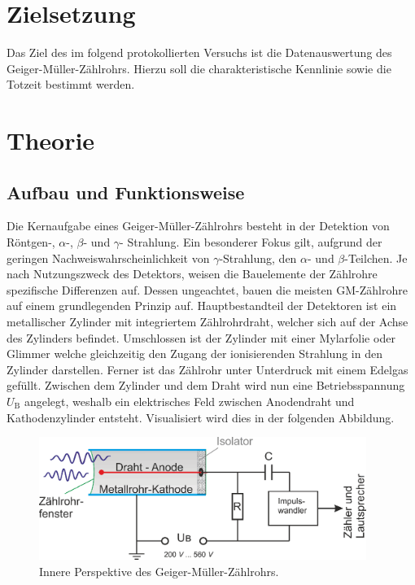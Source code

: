 %

%

\section{Zielsetzung}
\label{sec:Zielsetzung}

Das Ziel des im folgend protokollierten Versuchs ist die Datenauswertung des Geiger-Müller-Zählrohrs. Hierzu soll die 
charakteristische Kennlinie sowie die Totzeit bestimmt werden.

\section{Theorie}
\label{sec:Theorie}

\subsection{Aufbau und Funktionsweise}

\noindent Die Kernaufgabe eines Geiger-Müller-Zählrohrs besteht in der Detektion von Röntgen-, $\alpha$-, $\beta$- und $\gamma$-
Strahlung. Ein besonderer Fokus gilt, aufgrund der geringen Nachweiswahrscheinlichkeit von $\gamma$-Strahlung, den
$\alpha$- und $\beta$-Teilchen. Je nach Nutzungszweck des Detektors, weisen die Bauelemente der Zählrohre spezifische 
Differenzen auf. Dessen ungeachtet, bauen die meisten GM-Zählrohre auf einem grundlegenden Prinzip auf. Hauptbestandteil 
der Detektoren ist ein metallischer Zylinder mit integriertem Zählrohrdraht, welcher sich auf der Achse des Zylinders 
befindet. Umschlossen ist der Zylinder mit einer Mylarfolie oder Glimmer welche gleichzeitig den Zugang der ionisierenden 
Strahlung in den Zylinder darstellen. Ferner ist das Zählrohr unter Unterdruck mit einem Edelgas gefüllt. Zwischen dem 
Zylinder und dem Draht wird nun eine Betriebsspannung $U_\text{B}$ angelegt, weshalb ein elektrisches Feld zwischen 
Anodendraht und Kathodenzylinder entsteht. Visualisiert wird dies in der folgenden Abbildung.

\begin{figure}
    \centering
    \includegraphics[height=4cm]{content/Aufbau1.png}
    \caption{Innere Perspektive des Geiger-Müller-Zählrohrs\cite{Aufbau1_GM}.}
    \label{fig:GM-Rohr}
\end{figure}

